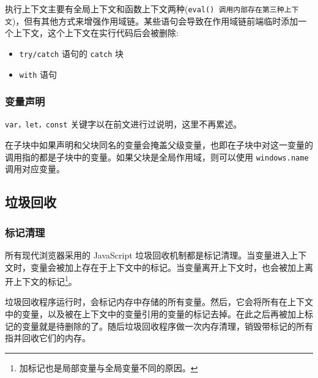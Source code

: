 执行上下文主要有全局上下文和函数上下文两种(\texttt{eval() 调用内部存在第三种上下文})，但有其他方式来增强作用域链。某些语句会导致在作用域链前端临时添加一个上下文，这个上下文在实行代码后会被删除:
\begin{itemize}
    \item \texttt{try/catch} 语句的 \texttt{catch} 块
    \item \texttt{with} 语句
\end{itemize}

\subsubsection*{变量声明}

\texttt{var，let，const} 关键字以在前文进行过说明，这里不再累述。

在子块中如果声明和父块同名的变量会掩盖父级变量，也即在子块中对这一变量的调用指的都是子块中的变量。如果父块是全局作用域，则可以使用 \texttt{windows.name} 调用对应变量。


\subsection{垃圾回收}
\subsubsection*{标记清理}

所有现代浏览器采用的 JavaScript 垃圾回收机制都是标记清理。当变量进入上下文时，变量会被加上存在于上下文中的标记。当变量离开上下文时，也会被加上离开上下文的标记\footnote{加标记也是局部变量与全局变量不同的原因。}。

垃圾回收程序运行时，会标记内存中存储的所有变量。然后，它会将所有在上下文中的变量，以及被在上下文中的变量引用的变量的标记去掉。在此之后再被加上标记的变量就是待删除的了。随后垃圾回收程序做一次内存清理，销毁带标记的所有指并回收它们的内存。


